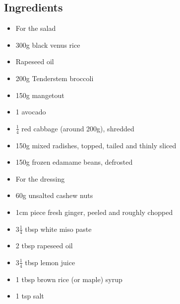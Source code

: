 \documentclass{book}
\begin{document}
\subsection*{Ingredients}
\begin{itemize}
\item For the salad
\item 300g black venus rice
\item Rapeseed oil
\item 200g Tenderstem broccoli
\item 150g mangetout
\item 1 avocado
\item $\frac{1}{4}$ red cabbage (around 200g), shredded
\item 150g mixed radishes, topped, tailed and thinly sliced
\item 150g frozen edamame beans, defrosted 
\end{itemize}

\begin{itemize}
\item For the dressing 
\item 60g unsalted cashew nuts
\item 1cm piece fresh ginger, peeled and roughly chopped 
\item 3$\frac{1}{4}$ tbsp white miso paste 
\item 2 tbsp rapeseed oil 
\item 3$\frac{1}{4}$ tbsp lemon juice 
\item 1 tbsp brown rice (or maple) syrup 
\item 1 tsp salt
\end{itemize}
\end{document}
